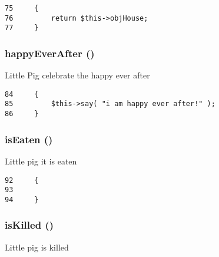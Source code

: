 \begin{Code}\begin{verbatim}75     {
76         return $this->objHouse;
77     }
\end{verbatim}
\end{Code}


\hypertarget{class_little_pig_11dd4caed12c9780c2dd944d6b024109}{
\subsubsection[{happyEverAfter}]{\setlength{\rightskip}{0pt plus 5cm}happyEverAfter ()}}
\label{class_little_pig_11dd4caed12c9780c2dd944d6b024109}


Little Pig celebrate the happy ever after 

\begin{Code}\begin{verbatim}84     {
85         $this->say( "i am happy ever after!" );
86     }
\end{verbatim}
\end{Code}


\hypertarget{class_little_pig_990f0b86c82d36f1f94ff331db475c85}{
\subsubsection[{isEaten}]{\setlength{\rightskip}{0pt plus 5cm}isEaten ()}}
\label{class_little_pig_990f0b86c82d36f1f94ff331db475c85}


Little pig it is eaten 

\begin{Code}\begin{verbatim}92     {
93 
94     }
\end{verbatim}
\end{Code}


\hypertarget{class_little_pig_ec29070d2544b3cfe0447dcbc5e6c199}{
\subsubsection[{isKilled}]{\setlength{\rightskip}{0pt plus 5cm}isKilled ()}}
\label{class_little_pig_ec29070d2544b3cfe0447dcbc5e6c199}


Little pig is killed 

